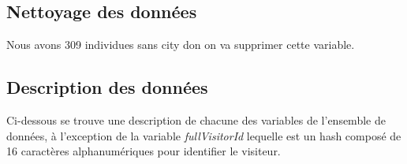 
\subsection{Nettoyage des données}
Nous avons 309 individues sans city don on va supprimer cette variable.

\subsection{Description des données}
Ci-dessous se trouve une description de chacune des variables de l'ensemble de données, à l'exception de la variable \textit{fullVisitorId} lequelle est un hash composé de 16 caractères alphanumériques pour identifier le visiteur.



